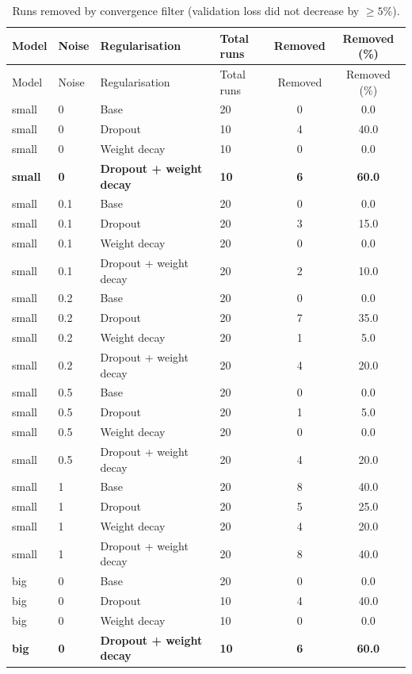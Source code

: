 \begin{longtable}{llllcc}
\caption{Runs removed by convergence filter (validation loss did not decrease by $\geq 5\%$).}
\label{tab:convergence_removed} \\
\toprule
Model & Noise & Regularisation & Total runs & Removed & Removed (\%) \\
\midrule
\endfirsthead
\toprule
Model & Noise & Regularisation & Total runs & Removed & Removed (\%) \\
\midrule
\endhead
\bottomrule
\endfoot
small & 0 & Base & 20 & 0 & 0.0 \\
small & 0 & Dropout & 10 & 4 & 40.0 \\
small & 0 & Weight decay & 10 & 0 & 0.0 \\
\textbf{small} & \textbf{0} & \textbf{Dropout + weight decay} & \textbf{10} & \textbf{6} & \textbf{60.0} \\
small & 0.1 & Base & 20 & 0 & 0.0 \\
small & 0.1 & Dropout & 20 & 3 & 15.0 \\
small & 0.1 & Weight decay & 20 & 0 & 0.0 \\
small & 0.1 & Dropout + weight decay & 20 & 2 & 10.0 \\
small & 0.2 & Base & 20 & 0 & 0.0 \\
small & 0.2 & Dropout & 20 & 7 & 35.0 \\
small & 0.2 & Weight decay & 20 & 1 & 5.0 \\
small & 0.2 & Dropout + weight decay & 20 & 4 & 20.0 \\
small & 0.5 & Base & 20 & 0 & 0.0 \\
small & 0.5 & Dropout & 20 & 1 & 5.0 \\
small & 0.5 & Weight decay & 20 & 0 & 0.0 \\
small & 0.5 & Dropout + weight decay & 20 & 4 & 20.0 \\
small & 1 & Base & 20 & 8 & 40.0 \\
small & 1 & Dropout & 20 & 5 & 25.0 \\
small & 1 & Weight decay & 20 & 4 & 20.0 \\
small & 1 & Dropout + weight decay & 20 & 8 & 40.0 \\
big & 0 & Base & 20 & 0 & 0.0 \\
big & 0 & Dropout & 10 & 4 & 40.0 \\
big & 0 & Weight decay & 10 & 0 & 0.0 \\
\textbf{big} & \textbf{0} & \textbf{Dropout + weight decay} & \textbf{10} & \textbf{6} & \textbf{60.0} \\

\end{longtable}
